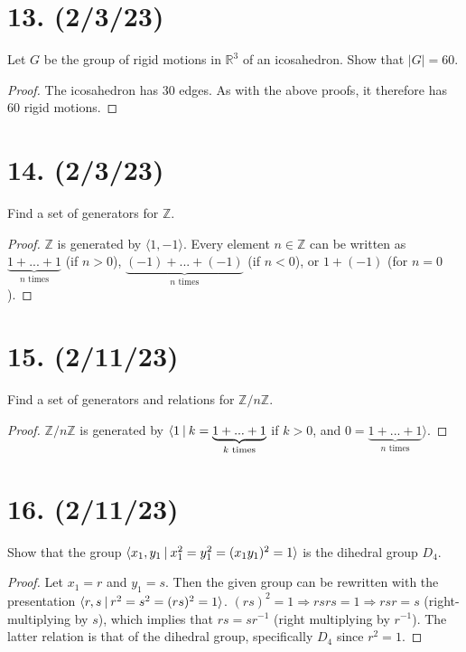 \documentclass{article}
\begin{document}
\section*{13. (2/3/23)}

Let $G$ be the group of rigid motions in $\mathbb{R}^3$ of an icosahedron. Show that $|G| = 60$.

\begin{proof}
    The icosahedron has 30 edges. As with the above proofs, it therefore has 60 rigid motions.
\end{proof}

\section*{14. (2/3/23)}

Find a set of generators for $\mathbb{Z}$.

\begin{proof}
    $\mathbb{Z}$ is generated by $\langle 1, -1 \rangle$. Every element $n \in \mathbb{Z}$ can be written as $\underbrace{1 + ... + 1}_{\text{$n$ times}}$ (if $n > 0$), $\underbrace{(-1) + ... + (-1)}_{\text{$n$ times}}$ (if $n < 0$), or $1 + (-1)$ (for $n = 0$).
\end{proof}

\section*{15. (2/11/23)}

Find a set of generators and relations for $\mathbb{Z}/n\mathbb{Z}$.

\begin{proof}
    $\mathbb{Z}/n\mathbb{Z}$ is generated by $\langle 1\hspace{0.5ex}|\hspace{0.5ex} k = \underbrace{1 + ... + 1}_{\text{$k$ times}}$ if $k > 0$, and $0 = \underbrace{1 + ... + 1}_{\text{$n$ times}} \rangle$.
\end{proof}

\section*{16. (2/11/23)}

Show that the group $\langle x_1, y_1 \hspace{0.5ex}|\hspace{0.5ex} x_1^2 = y_1^2 = (x_1 y_1)^2 = 1 \rangle$ is the dihedral group $D_4$.

\begin{proof}
    Let $x_1 = r$ and $y_1 = s$. Then the given group can be rewritten with the presentation $\langle r, s \hspace{0.5ex}|\hspace{0.5ex} r^2 = s^2 = (rs)^2 = 1 \rangle$. $(rs)^2 = 1 \Rightarrow rsrs = 1 \Rightarrow rsr = s$ (right-multiplying by $s$), which implies that $rs = sr^{-1}$ (right multiplying by $r^{-1}$). The latter relation is that of the dihedral group, specifically $D_4$ since $r^2 = 1$.
\end{proof}
\end{document}
